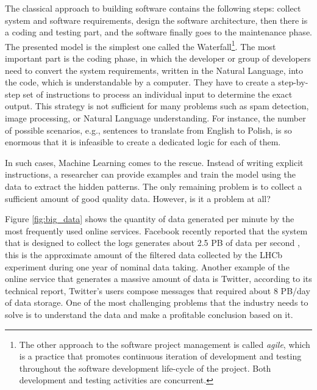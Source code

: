 The classical approach to building software contains the following steps: collect system and software requirements,
design the software architecture, then there is a coding and testing part, and the software finally goes to the maintenance phase. The presented model is the simplest one called the Waterfall\footnote{The other approach to the software project management is called \textit{agile}, which is a practice that promotes continuous iteration of development and testing throughout the software development life-cycle of the project. Both development and testing activities are concurrent.}. The most important part is the coding phase, in which the developer or group of developers need to convert the system requirements, written in the Natural Language, into the code, which is understandable by a computer. They have to create a step-by-step set of instructions to process an individual input to determine the exact output. 
This strategy is not sufficient for many problems such as spam detection, image processing, or Natural Language understanding. For instance, the number of possible scenarios, e.g., sentences to translate from English to Polish, is so enormous that it is infeasible to create a dedicated logic for each of them. 

In such cases, Machine Learning comes to the rescue. Instead of writing explicit instructions, a researcher can provide examples and train the model using the data to extract the hidden patterns. The only remaining problem is to collect a sufficient amount of good quality data. However, is it a problem at all? 

Figure \ref{fig:big_data} shows the quantity of data generated per minute by the most frequently used online services. Facebook recently reported that the system that is designed to collect the logs generates about 2.5 PB of data per second \cite{facebook}, this is the approximate amount of the filtered data collected by the LHCb experiment during one year of nominal data taking. Another example of the online service that generates a massive amount of data is Twitter, according to its technical report, Twitter's users compose messages that required about 8 PB/day of data storage. One of the most challenging problems that the industry needs to solve is to understand the data and make a profitable conclusion based on it.

